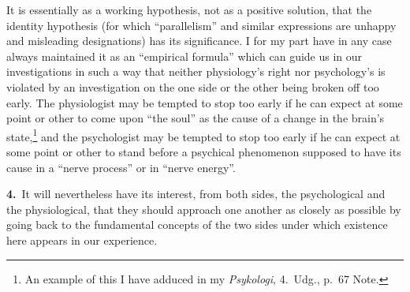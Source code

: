 \documentclass[12pt,a4paper]{book}
\begin{document}
It is essentially as a working hypothesis, not as a positive solution, that the
identity hypothesis (for which ``parallelism'' and similar expressions are
unhappy and misleading designations) has its significance. I for my part have in
any case always maintained it as an ``empirical formula'' which can guide us in
our investigations in such a way that neither physiology's right nor
psychology's is violated by an investigation on the one side or the other being
broken off too early. The physiologist may be tempted to stop too early if he
can expect at some point or other to come upon ``the soul'' as the cause of a
change in the brain's state,\footnote{An example of this I have adduced in my
\textit{Psykologi}, 4.~Udg., p.~67 Note.} and the psychologist may be tempted to
stop too early if he can expect at some point or other to stand before a
psychical phenomenon supposed to have its cause in a ``nerve process'' or in
``nerve energy''.

\bigskip

\noindent\textbf{4.}~It will nevertheless have its interest, from both sides,
the psychological and the physiological, that they should approach one another
as closely as possible by going back to the fundamental concepts of the two
sides under which existence here appears in our experience.
\end{document}
